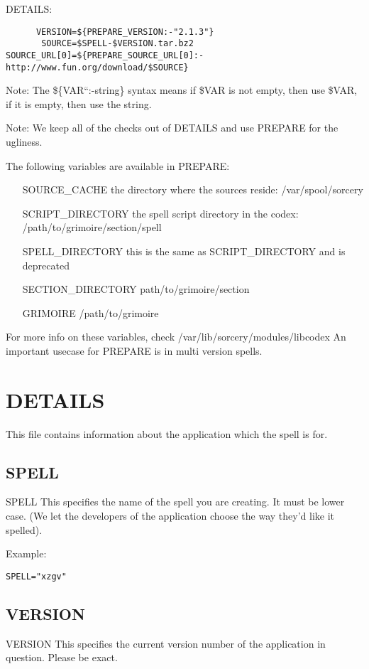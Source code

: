 \documentclass[a4paper,10pt]{book}
\begin{document}
DETAILS:
\begin{verbatim}
      VERSION=${PREPARE_VERSION:-"2.1.3"}
       SOURCE=$SPELL-$VERSION.tar.bz2
SOURCE_URL[0]=${PREPARE_SOURCE_URL[0]:-http://www.fun.org/download/$SOURCE}
\end{verbatim}

Note: The \$\{VAR``:-string\}  syntax means if \$VAR is not empty, then use
\$VAR,
if it is empty, then use the string.

Note: We keep all of the checks out of DETAILS and use PREPARE for the
ugliness.

The following variables are available in PREPARE:
\begin{itemize}
\item[SOURCE\_CACHE] the directory where the sources reside:
/var/spool/sorcery
\item[SCRIPT\_DIRECTORY] the spell script directory in the codex:
/path/to/grimoire/section/spell
\item[SPELL\_DIRECTORY] this is the same as \textdollar SCRIPT\_DIRECTORY and
is deprecated
\item[SECTION\_DIRECTORY] path/to/grimoire/section
\item[GRIMOIRE] /path/to/grimoire
\end{itemize}

For more info on these variables, check /var/lib/sorcery/modules/libcodex
An important usecase for PREPARE is in multi version spells.

\section{DETAILS}
This file contains information about the application which the spell is for.
\subsection{SPELL}
SPELL
	This specifies the name of the spell you are creating. It must be
	lower case. (We let the developers of the application choose the way
	they'd like it spelled).

Example:
\begin{verbatim}
SPELL="xzgv"
\end{verbatim}

\subsection{VERSION}
VERSION
	This specifies the current version number of the application in
	question. Please be exact.
\end{document}
